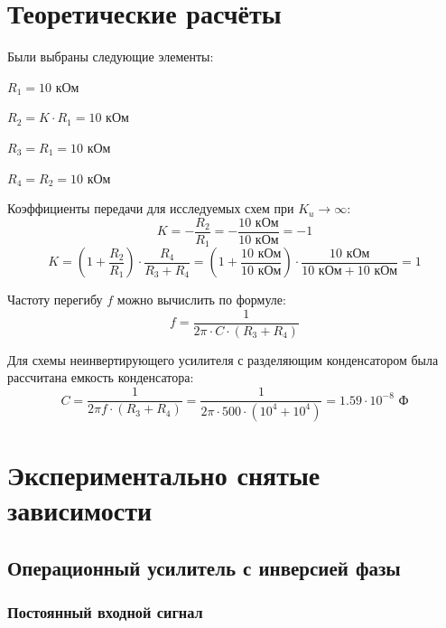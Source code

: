\section{Теоретические расчёты}

Были выбраны следующие элементы:
\begin{center}
	$R_1 = 10$ кОм
	
	$R_2 = K\cdot R_1 = 10$ кОм

	$R_3 = R_1 = 10$ кОм

	$R_4 = R_2 = 10$ кОм
\end{center}

Коэффициенты передачи для исследуемых схем при $K_u \rightarrow \infty$:
\begin{equation}\label{eq:k1}
	K = -\frac{R_2}{R_1} = -\frac{10\text{ кОм}}{10\text{ кОм}} = -1 
\end{equation}
\vspace{-0.75cm}
\begin{equation}\label{eq:k2}
	K = \left(1+\frac{R_2}{R_1}\right) \cdot \frac{R_4}{R_3 + R_4} = \left(1+\frac{10\text{ кОм}}{10\text{ кОм}}\right) \cdot \frac{10\text{ кОм}}{10\text{ кОм} + 10\text{ кОм}} = 1
\end{equation}

Частоту перегибу $f$ можно вычислить по формуле: 
\begin{equation}
f = \frac{1}{2 \pi \cdot C \cdot (R_3 + R_4)}
\end{equation}

Для схемы неинвертирующего усилителя с разделяющим конденсатором была рассчитана емкость конденсатора: \\
\begin{displaymath}
	C = \frac{1}{2\pi f\cdot (R_3 + R_4)} = \frac{1}{2\pi \cdot 500\cdot  (10^4 + 10^4)} = 1.59\cdot 10^{-8}\text{ Ф}
\end{displaymath}

\section{Экспериментально снятые зависимости}

\subsection{Операционный усилитель с инверсией фазы}

\subsubsection{Постоянный входной сигнал}

